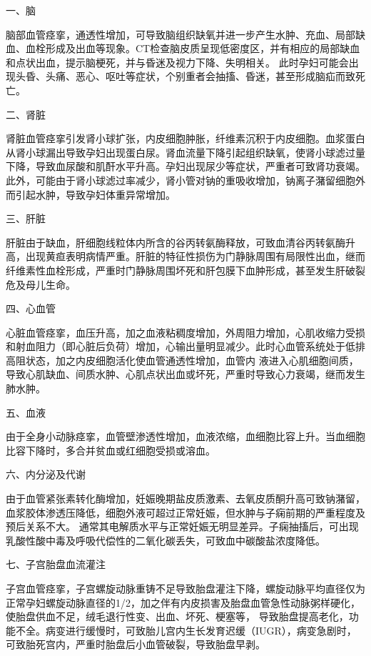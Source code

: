 一、脑

脑部血管痉挛，通透性增加，可导致脑组织缺氧并进一步产生水肿、充血、局部缺血、血栓形成及出血等现象。CT检查脑皮质呈现低密度区，并有相应的局部缺血和点状出血，提示脑梗死，并与昏迷及视力下降、失明相关。
此时孕妇可能会出现头昏、头痛、恶心、呕吐等症状，个别重者会抽搐、昏迷，甚至形成脑疝而致死亡。

二、肾脏

肾脏血管痉挛引发肾小球扩张，内皮细胞肿胀，纤维素沉积于内皮细胞。血浆蛋白从肾小球漏出导致孕妇出现蛋白尿。肾血流量下降引起组织缺氧，使肾小球滤过量下降，导致血尿酸和肌酐水平升高。孕妇出现尿少等症状，严重者可致肾功衰竭。
此外，可能由于肾小球滤过率减少，肾小管对钠的重吸收增加，钠离子潴留细胞外而引起水肿，导致孕妇体重异常增加。

三、肝脏

肝脏由于缺血，肝细胞线粒体内所含的谷丙转氨酶释放，可致血清谷丙转氨酶升高，出现黄疸表明病情严重。肝脏的特征性损伤为门静脉周围有局限性出血，继而纤维素性血栓形成，严重时门静脉周围坏死和肝包膜下血肿形成，甚至发生肝破裂危及母儿生命。

四、心血管

心脏血管痉挛，血压升高，加之血液粘稠度增加，外周阻力增加，心肌收缩力受损和射血阻力（即心脏后负荷）增加，心输出量明显减少。此时心血管系统处于低排高阻状态，加之内皮细胞活化使血管通透性增加，血管内
液进入心肌细胞间质，导致心肌缺血、间质水肿、心肌点状出血或坏死，严重时导致心力衰竭，继而发生肺水肿。

五、血液

由于全身小动脉痉挛，血管壁渗透性增加，血液浓缩，血细胞比容上升。当血细胞比容下降时，多合并贫血或红细胞受损或溶血。

六、内分泌及代谢

由于血管紧张素转化酶增加，妊娠晚期盐皮质激素、去氧皮质酮升高可致钠潴留，血浆胶体渗透压降低，细胞外液可超过正常妊娠，但水肿与子痫前期的严重程度及预后关系不大。
通常其电解质水平与正常妊娠无明显差异。子痫抽搐后，可出现乳酸性酸中毒及呼吸代偿性的二氧化碳丢失，可致血中碳酸盐浓度降低。

七、子宫胎盘血流灌注

子宫血管痉挛，子宫螺旋动脉重铸不足导致胎盘灌注下降，螺旋动脉平均直径仅为正常孕妇螺旋动脉直径的1/2，加之伴有内皮损害及胎盘血管急性动脉粥样硬化，使胎盘供血不足，绒毛退行性变、出血、坏死、梗塞等，
导致胎盘提高老化，功能不全。病变进行缓慢时，可致胎儿宫内生长发育迟缓（IUGR），病变急剧时，可致胎死宫内，严重时胎盘后小血管破裂，导致胎盘早剥。


